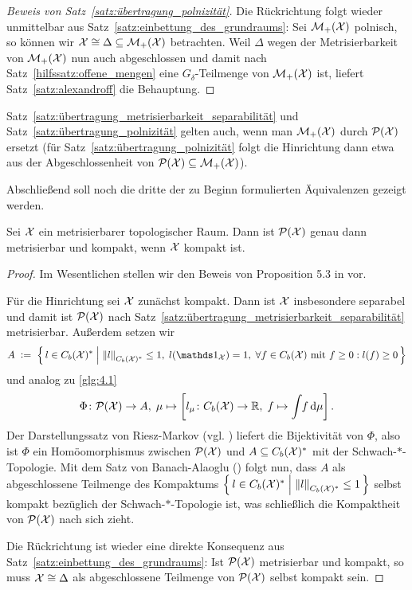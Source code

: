 \documentclass[../thesis/thesis.tex]{subfiles}
\begin{document}
\begin{proof}[Beweis von Satz~\ref{satz:übertragung_polnizität}]
		Die Rückrichtung folgt wieder unmittelbar aus Satz~\ref{satz:einbettung_des_grundraums}: Sei $\mathcal{M}_{+}(\mathcal{X})$ polnisch, 
		so können wir $\mathcal{X} \cong \Delta \subseteq \mathcal{M}_{+}(\mathcal{X})$ betrachten. Weil $\Delta$ wegen der Metrisierbarkeit von $\mathcal{M}_{+}(\mathcal{X})$ nun auch abgeschlossen und damit nach 
		Satz~\ref{hilfssatz:offene_mengen} eine $G_\delta$-Teilmenge von $\mathcal{M}_{+}(\mathcal{X})$ ist, liefert Satz~\ref{satz:alexandroff} die Behauptung.
	\end{proof}

	\begin{Bemerkung}
		Satz~\ref{satz:übertragung_metrisierbarkeit_separabilität} und Satz~\ref{satz:übertragung_polnizität} gelten auch, wenn man $\mathcal{M}_{+}(\mathcal{X})$ durch $\mathcal{P}(\mathcal{X})$ ersetzt 
		(für Satz~\ref{satz:übertragung_polnizität} folgt die Hinrichtung dann etwa aus der Abgeschlossenheit von $\mathcal{P}(\mathcal{X}) \subseteq \mathcal{M}_{+}(\mathcal{X})$).
	\end{Bemerkung}

	Abschließend soll noch die dritte der zu Beginn formulierten Äquivalenzen gezeigt werden.

	\begin{Satz}
		\label{satz:übertragung_kompaktheit}
		Sei $\mathcal{X}$ ein metrisierbarer topologischer Raum. Dann ist $\mathcal{P}(\mathcal{X})$ genau dann metrisierbar und kompakt, wenn $\mathcal{X}$ kompakt ist.
	\end{Satz}
	
	\begin{proof}
		Im Wesentlichen stellen wir den Beweis von Proposition 5.3 in \cite{vanGaans.200203} vor.
		
		Für die Hinrichtung sei $\mathcal{X}$ zunächst kompakt. Dann ist $\mathcal{X}$ insbesondere separabel und damit ist $\mathcal{P}(\mathcal{X})$ 
		nach Satz~\ref{satz:übertragung_metrisierbarkeit_separabilität} metrisierbar.
		Außerdem setzen wir
		\[ A \; \defby \; \setcomp{l \in \Bdcontfct{\X}^\ast}{\norm{l}_{\Bdcontfct{\X}^\ast} \leq 1, \; l(\indfct_{\X}) = 1, \; 
			\forall f \in \Bdcontfct{\X} \text{ mit } f \geq 0 : l(f) \geq 0}\]
		und analog zu \eqref{glg:4.1}
		\[ \Phi \colon \mathcal{P}(\mathcal{X}) \to A, \; \mu \mapsto \left[l_\mu \colon C_b(\mathcal{X}) \to \mathbb{R}, \; f \mapsto \int_{} \, f \, \mathrm{d}\mu \right]  \text{.} \]
		Der Darstellungssatz von Riesz-Markov (vgl. \cite[Satz 4.8.8]{Simon.2015}) liefert die Bijektivität von $\Phi$, also ist $\Phi$ ein 
		Homöomorphismus zwischen $\mathcal{P}(\mathcal{X})$ und $A \subseteq C_b(\mathcal{X})^\ast$ 
		mit der Schwach-$\ast$-Topologie. Mit dem Satz von Banach-Alaoglu (\cite[Satz 5.8.1]{Simon.2015}) folgt nun, dass $A$ als abgeschlossene Teilmenge des Kompaktums 
		$\left\{\, l \in C_b(\mathcal{X})^\ast \; \middle| \; \left\lVert l\right\rVert_{C_b(\mathcal{X})^\ast} \leq 1 \,\right\}$ selbst kompakt bezüglich der Schwach-$\ast$-Topologie ist, 
		was schließlich die Kompaktheit von $\mathcal{P}(\mathcal{X})$ nach sich zieht.
		
		Die Rückrichtung ist wieder eine direkte Konsequenz aus Satz~\ref{satz:einbettung_des_grundraums}: Ist $\mathcal{P}(\mathcal{X})$ metrisierbar und kompakt, so muss 
		$\mathcal{X} \cong \Delta$ als abgeschlossene Teilmenge von $\mathcal{P}(\mathcal{X})$ selbst kompakt sein.
	\end{proof}
\end{document}
